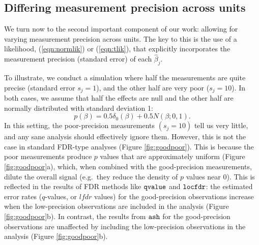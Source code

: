 \documentclass[11pt]{article}
\def\lfdr{\textit{lfdr}}
\def\bhat{\hat{\beta}}
\def\qvalue{{\tt qvalue}\xspace}
\def\locfdr{{\tt locfdr}\xspace}
\def\ash{{\tt ash}\xspace}
\begin{document}
%
%
%
%
%


\subsection*{Differing measurement precision across units}

 We turn now to the second important component of our work: allowing for varying
 measurement precision across units. The key to this is the use of a likelihood,
 (\ref{eqn:normlik}) or (\ref{eqn:tlik}), that explicitly incorporates the measurement precision (standard error) of each $\bhat_j$.
 
  To illustrate, we conduct a simulation where half the measurements are quite precise (standard error $s_j = 1$), and the other half are very poor
 ($s_j=10$).  In both cases,
we assume that half the effects are null
and the other half are normally distributed with standard deviation 1:
\begin{equation}
p(\beta) = 0.5 \delta_0(\beta) + 0.5 N(\beta; 0,1).
\end{equation}
In this setting, the poor-precision measurements $(s_j=10)$ tell us very little, and any sane analysis should effectively ignore them. 
 However, this is not the case in standard FDR-type analyses (Figure \ref{fig:goodpoor}). This is because the poor measurements 
 produce $p$ values that are approximately uniform  (Figure \ref{fig:goodpoor}a), 
 which, when combined with the good-precision measurements, dilute the overall signal 
 (e.g.~they reduce the density of $p$ values near 0).
 This is reflected in the results of FDR methods like $\qvalue$ and $\locfdr$:
the estimated error rates ($q$-values, or $\lfdr$ values) for the good-precision observations increase when the low-precision observations are included in the analysis
(Figure \ref{fig:goodpoor}b). In contrast, the results from $\ash$ 
for the good-precision observations are unaffected by including the low-precision observations in the analysis (Figure \ref{fig:goodpoor}b).
\end{document}

